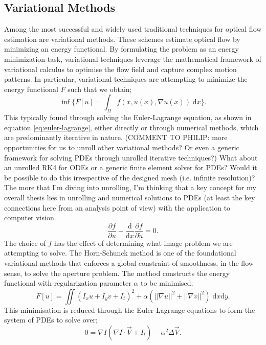 \subsection{Variational Methods}

\IEEEPARstart{}{} Among the most successful and widely used traditional techniques for optical flow estimation are variational methods. These schemes estimate optical flow by minimizing an energy functional. By formulating the problem as an energy minimization task, variational techniques leverage the mathematical framework of variational calculus to optimise the flow field and capture complex motion patterns. In particular, variational techniques are attempting to minimize the energy functional $F$ such that we obtain;
\begin{equation}
	\inf \Bigg\{ F[u] = \int_{\Omega} f(x, u(x), \nabla u(x)) \; \mathrm{d}x\Bigg\}.
\end{equation}
This typically found through solving the Euler-Lagrange equation, as shown in equation \ref{eq:euler-lagrange}, either directly or through numerical methods, which are predominantly iterative in nature. \color{orange}(COMMENT TO PHILIP: more opportunities for us to unroll other variational methods? Or even a generic framework for solving PDEs through unrolled iterative techniques?) What about an unrolled RK4 for ODEs or a generic finite element solver for PDEs? Would it be possible to do this irrespective of the designed mesh (i.e. infinite resolution)? The more that I'm diving into unrolling, I'm thinking that a key concept for my overall thesis lies in unrolling and numerical solutions to PDEs (at least the key connections here from an analysis point of view) with the application to computer vision.\color{black}
\begin{equation} \label{eq:euler-lagrange}
	\frac{\partial f}{\partial u} - \frac{\mathrm{d}}{\mathrm{d}x} \frac{\partial f}{\partial \dot{u}} = 0.
\end{equation}
The choice of $f$ has the effect of determining what image problem we are attempting to solve. The Horn-Schunck method is one of the foundational variational methods that enforces a global constraint of smoothness, in the flow sense, to solve the aperture problem. The method constructs the energy functional with regularization parameter $\alpha$ to be minimised;
\begin{equation*}
	F[u] = \iint ( I_x u + I_y v + I_t)^2 + \alpha (||\nabla u||^2 + ||\nabla v||^2) \; \mathrm{d}x \mathrm{d}y.
\end{equation*}
This minimisation is reduced through the Euler-Lagrange equations to form the system of PDEs to solve over;
\begin{equation}
		0 = \nabla I (\nabla I \cdot \vec{V} + I_t ) - \alpha^2 \Delta \vec{V}.
\end{equation}


